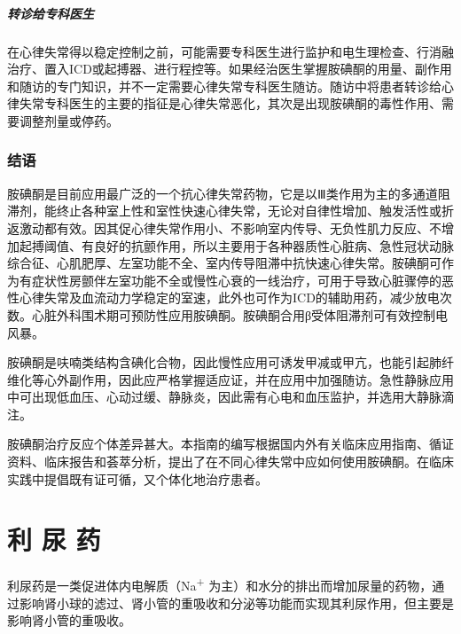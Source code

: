 \paragraph{转诊给专科医生}

在心律失常得以稳定控制之前，可能需要专科医生进行监护和电生理检查、行消融治疗、置入ICD或起搏器、进行程控等。如果经治医生掌握胺碘酮的用量、副作用和随访的专门知识，并不一定需要心律失常专科医生随访。随访中将患者转诊给心律失常专科医生的主要的指征是心律失常恶化，其次是出现胺碘酮的毒性作用、需要调整剂量或停药。

\subsection{结语}

胺碘酮是目前应用最广泛的一个抗心律失常药物，它是以Ⅲ类作用为主的多通道阻滞剂，能终止各种室上性和室性快速心律失常，无论对自律性增加、触发活性或折返激动都有效。因其促心律失常作用小、不影响室内传导、无负性肌力反应、不增加起搏阈值、有良好的抗颤作用，所以主要用于各种器质性心脏病、急性冠状动脉综合征、心肌肥厚、左室功能不全、室内传导阻滞中抗快速心律失常。胺碘酮可作为有症状性房颤伴左室功能不全或慢性心衰的一线治疗，可用于导致心脏骤停的恶性心律失常及血流动力学稳定的室速，此外也可作为ICD的辅助用药，减少放电次数。心脏外科围术期可预防性应用胺碘酮。胺碘酮合用β受体阻滞剂可有效控制电风暴。

胺碘酮是呋喃类结构含碘化合物，因此慢性应用可诱发甲减或甲亢，也能引起肺纤维化等心外副作用，因此应严格掌握适应证，并在应用中加强随访。急性静脉应用中可出现低血压、心动过缓、静脉炎，因此需有心电和血压监护，并选用大静脉滴注。

胺碘酮治疗反应个体差异甚大。本指南的编写根据国内外有关临床应用指南、循证资料、临床报告和荟萃分析，提出了在不同心律失常中应如何使用胺碘酮。在临床实践中提倡既有证可循，又个体化地治疗患者。

\protect\hypertarget{text00426.html}{}{}

\chapter{利 尿 药}

利尿药是一类促进体内电解质（Na\textsuperscript{+}
为主）和水分的排出而增加尿量的药物，通过影响肾小球的滤过、肾小管的重吸收和分泌等功能而实现其利尿作用，但主要是影响肾小管的重吸收。

